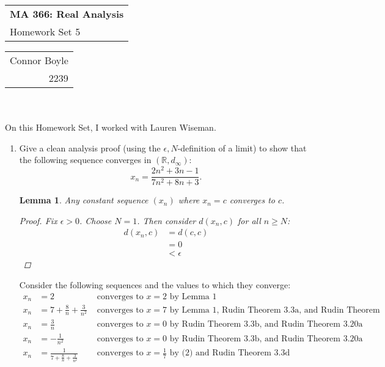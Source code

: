\documentclass{amsart}
\def\name{Connor Boyle} %
\def\CM{2239} %
\def\hwnum{5} %
\newtheorem{lemma}[theorem]{Lemma}
\begin{document}
\noindent
\thispagestyle{firststyle}
\begin{tabular}{l}
{\LARGE \textbf{MA 366: Real Analysis} }\\
{\Large Homework Set \hwnum}
\end{tabular} \hfill \begin{tabular}{r}
                        \name \\
                        \CM
                        \end{tabular}

\noindent \hrulefill \\\\
On this Homework Set, I worked with Lauren Wiseman.\\
\begin{enumerate}[1.]
\item Give a clean analysis proof (using the $\epsilon,N$-definition of a limit) to show that the following sequence converges in $(\mathbb{R},d_{\infty})$:
\[ x_n = \frac{2n^2+3n-1}{7n^2+8n+3}. \]
\begin{lemma}
    Any constant sequence $(x_n)$ where $x_n = c$ converges to $c$.
    \begin{proof}
        Fix $\epsilon > 0$. Choose $N = 1$. Then consider $d(x_n, c)$ for all $n \geq N$:
        \begin{align*}
            d(x_n, c) &= d(c, c) \\
            &= 0 \\
            &< \epsilon
        \end{align*}
    \end{proof}
\end{lemma}
Consider the following sequences and the values to which they converge:
\begin{align}
    x_n &= 2 &\text{ converges to } x = 2 \text{ by Lemma 1}\\
    x_n &= 7 + \frac{8}{n} + \frac{3}{n^2} &\text{ converges to } x = 7 \text{ by Lemma 1, Rudin Theorem 3.3a, and Rudin Theorem 3.20a} \\
    x_n &= \frac{3}{n} &\text{ converges to } x = 0 \text{ by Rudin Theorem 3.3b, and Rudin Theorem 3.20a}\\
    x_n &= -\frac{1}{n^2} &\text{ converges to } x = 0 \text{ by Rudin Theorem 3.3b, and Rudin Theorem 3.20a} \\
    x_n &= \frac{1}{7 + \frac{8}{n} + \frac{3}{n^2}} &\text{ converges to } x = \frac{1}{7} \text{ by (2) and Rudin Theorem 3.3d} \\

\end{align}
\end{enumerate}
\end{document}
